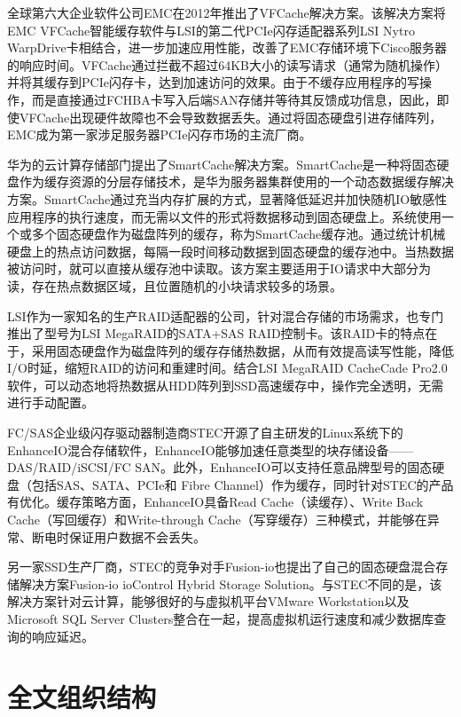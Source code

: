 全球第六大企业软件公司EMC在2012年推出了VFCache解决方案\cite{vfcache}。该解决方案将EMC VFCache智能缓存软件与LSI的第二代PCIe闪存适配器系列LSI Nytro WarpDrive卡相结合，进一步加速应用性能，改善了EMC存储环境下Cisco服务器的响应时间。VFCache通过拦截不超过64KB大小的读写请求（通常为随机操作）并将其缓存到PCIe闪存卡，达到加速访问的效果。由于不缓存应用程序的写操作，而是直接通过FCHBA卡写入后端SAN存储并等待其反馈成功信息，因此，即使VFCache出现硬件故障也不会导致数据丢失。通过将固态硬盘引进存储阵列，EMC成为第一家涉足服务器PCIe闪存市场的主流厂商。

华为的云计算存储部门提出了SmartCache解决方案\cite{smartcache}。SmartCache是一种将固态硬盘作为缓存资源的分层存储技术，是华为服务器集群使用的一个动态数据缓存解决方案。SmartCache通过充当内存扩展的方式，显著降低延迟并加快随机IO敏感性应用程序的执行速度，而无需以文件的形式将数据移动到固态硬盘上。系统使用一个或多个固态硬盘作为磁盘阵列的缓存，称为SmartCache缓存池。通过统计机械硬盘上的热点访问数据，每隔一段时间移动数据到固态硬盘的缓存池中。当热数据被访问时，就可以直接从缓存池中读取。该方案主要适用于IO请求中大部分为读，存在热点数据区域，且位置随机的小块请求较多的场景。

LSI作为一家知名的生产RAID适配器的公司，针对混合存储的市场需求，也专门推出了型号为LSI MegaRAID的SATA+SAS RAID控制卡。该RAID卡的特点在于，采用固态硬盘作为磁盘阵列的缓存存储热数据，从而有效提高读写性能，降低I/O时延，缩短RAID的访问和重建时间。结合LSI MegaRAID CacheCade Pro2.0软件\cite{lsiraidcache}，可以动态地将热数据从HDD阵列到SSD高速缓存中，操作完全透明，无需进行手动配置。

FC/SAS企业级闪存驱动器制造商STEC开源了自主研发的Linux系统下的EnhanceIO混合存储软件\cite{enhanceio}，EnhanceIO能够加速任意类型的块存储设备——DAS/RAID/iSCSI/FC SAN。此外，EnhanceIO可以支持任意品牌型号的固态硬盘（包括SAS、SATA、PCIe和 Fibre Channel）作为缓存，同时针对STEC的产品有优化。缓存策略方面，EnhanceIO具备Read Cache（读缓存）、Write Back Cache（写回缓存）和Write-through Cache（写穿缓存）三种模式，并能够在异常、断电时保证用户数据不会丢失。

另一家SSD生产厂商，STEC的竞争对手Fusion-io也提出了自己的固态硬盘混合存储解决方案Fusion-io ioControl Hybrid Storage Solution\cite{fusionio}。与STEC不同的是，该解决方案针对云计算，能够很好的与虚拟机平台VMware Workstation以及Microsoft SQL Server Clusters整合在一起，提高虚拟机运行速度和减少数据库查询的响应延迟。

\section{全文组织结构}
\label{sec:organization}

